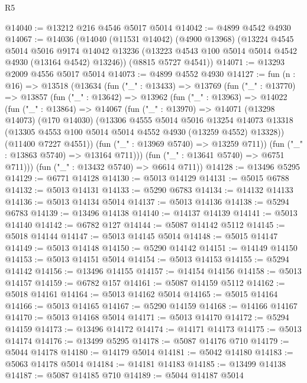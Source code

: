 \begin{lexlean}{R5}
\begin{coremodule}
@14040 := @13212 @216 @4546 @5017 @5014
@14042 := @4899 @4542 @4930
@14067 := @14036
    (@14040
      (@11531 @14042)
      (@4900 @13968)
      (@13224
        @4545
        @5014
        @5016
        @9174
        @14042
        @13236
        (@13223 @4543 @100 @5014 @5014 @4542 @4930 (@13164 @4542) @13246))
      (@8815 @5727 @4541))
@14071 := @13293 @2009 @4556 @5017 @5014
@14073 := @4899 @4552 @4930
@14127 := fun (n : @16) =>
  @13518
    (@13634
      (fun ("_" : @13433) =>
      @13769
        (fun ("_" : @13770) =>
        @13857
          (fun ("_" : @13642) =>
          @13962
            (fun ("_" : @13963) =>
            @14022
              (fun ("_" : @13864) =>
              @14067
                (fun ("_" : @13970) =>
                @14071
                  (@13298 @14073)
                  (@170 @14030)
                  (@13306
                    @4555
                    @5014
                    @5016
                    @13254
                    @14073
                    @13318
                    (@13305 @4553 @100 @5014 @5014 @4552 @4930 (@13259 @4552) @13328))
                  (@11400 @7227 @4551))
                (fun ("_" : @13969 @5740) => @13259 @711))
              (fun ("_" : @13863 @5740) => @13164 @711)))
          (fun ("_" : @13641 @5740) => @6751 @711)))
      (fun ("_" : @13432 @5740) => @6614 @711))
@14128 := @13496 @5295
@14129 := @6771 @14128
@14130 := @5013 @14129
@14131 := @5015 @6788
@14132 := @5013 @14131
@14133 := @5290 @6783
@14134 := @14132 @14133
@14136 := @5013 @14134 @5014
@14137 := @5013 @14136
@14138 := @5294 @6783
@14139 := @13496 @14138
@14140 := @14137 @14139
@14141 := @5013 @14140
@14142 := @6782 @127
@14144 := @5087 @14142 @5112
@14145 := @5018 @14144
@14147 := @5013 @14145 @5014
@14148 := @5015 @14147
@14149 := @5013 @14148
@14150 := @5290 @14142
@14151 := @14149 @14150
@14153 := @5013 @14151 @5014
@14154 := @5013 @14153
@14155 := @5294 @14142
@14156 := @13496 @14155
@14157 := @14154 @14156
@14158 := @5013 @14157
@14159 := @6782 @157
@14161 := @5087 @14159 @5112
@14162 := @5018 @14161
@14164 := @5013 @14162 @5014
@14165 := @5015 @14164
@14166 := @5013 @14165
@14167 := @5290 @14159
@14168 := @14166 @14167
@14170 := @5013 @14168 @5014
@14171 := @5013 @14170
@14172 := @5294 @14159
@14173 := @13496 @14172
@14174 := @14171 @14173
@14175 := @5013 @14174
@14176 := @13499 @5295
@14178 := @5087 @14176 @710
@14179 := @5044 @14178
@14180 := @14179 @5014
@14181 := @5042 @14180
@14183 := @5063 @14178 @5014
@14184 := @14181 @14183
@14185 := @13499 @14138
@14187 := @5087 @14185 @710
@14189 := @5044 @14187 @5014

\end{coremodule}
\end{lexlean}
